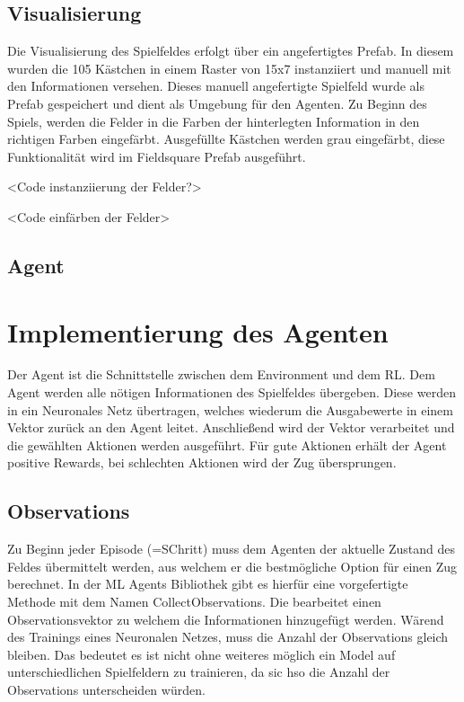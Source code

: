 \subsection{Visualisierung}
Die Visualisierung des Spielfeldes erfolgt über ein angefertigtes Prefab. In diesem wurden die 105 Kästchen in einem Raster von 15x7 instanziiert und manuell mit den Informationen versehen. Dieses manuell angefertigte Spielfeld wurde als Prefab gespeichert und dient als Umgebung für den Agenten.
Zu Beginn des Spiels, werden die Felder in die Farben der hinterlegten Information in den richtigen Farben eingefärbt. Ausgefüllte Kästchen werden grau eingefärbt, diese Funktionalität wird im Fieldsquare Prefab ausgeführt.

<Code instanziierung der Felder?>

<Code einfärben der Felder>

\subsection{Agent}

\section{Implementierung des Agenten}
Der Agent ist die Schnittstelle zwischen dem Environment und dem RL.
Dem Agent werden alle nötigen Informationen des Spielfeldes übergeben. Diese werden in ein Neuronales Netz übertragen, welches wiederum die Ausgabewerte in einem Vektor zurück an den Agent leitet.
Anschließend wird der Vektor verarbeitet und die gewählten Aktionen werden ausgeführt.
Für gute Aktionen erhält der Agent positive Rewards, bei schlechten Aktionen wird der Zug übersprungen.

\subsection{Observations}
Zu Beginn jeder Episode (=SChritt) muss dem Agenten der aktuelle Zustand des Feldes übermittelt werden, aus welchem er die bestmögliche Option für einen Zug berechnet. In der ML Agents Bibliothek gibt es hierfür eine vorgefertigte Methode mit dem Namen CollectObservations.
Die bearbeitet einen Observationsvektor zu welchem die Informationen hinzugefügt werden.
Wärend des Trainings eines Neuronalen Netzes, muss die Anzahl der Observations gleich bleiben. Das bedeutet es ist nicht ohne weiteres möglich ein Model auf unterschiedlichen Spielfeldern zu trainieren, da sic hso die Anzahl der Observations unterscheiden würden.


